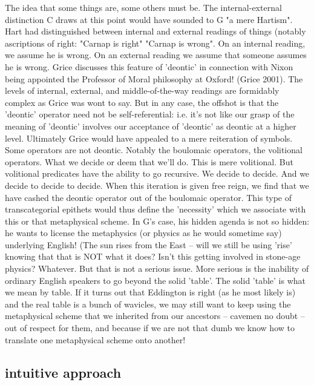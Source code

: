 \documentclass[10pt,titlepage]{book}
\begin{document}
The idea that some things are, some others must be. The  internal-external 
distinction C draws at this point would have sounded to G "a  mere 
Hartism". Hart had distinguished between internal and external readings of  things 
(notably ascriptions of right: "Carnap is right" "Carnap is wrong". On an  
internal reading, we assume he is wrong. On an external reading we assume 
that  someone assumes he is wrong. Grice discusses this feature of 'deontic' 
in  connection with Nixon being appointed the Professor of Moral philosophy 
at  Oxford! (Grice 2001). The levels of internal, external, and 
middle-of-the-way  readings are formidably complex as Grice was wont to say. But in any 
case, the  offshot is that the 'deontic' operator need not be 
self-referential: i.e. it's  not like our grasp of the meaning of 'deontic' involves our 
acceptance of  'deontic' as deontic at a higher level. Ultimately Grice would 
have appealed to  a mere reiteration of symbols. Some operators are not 
deontic. Notably the  boulomaic operators, the volitional operators. What we 
decide or deem that  we'll do. This is mere volitional. But volitional 
predicates have the ability to  go recursive. We decide to decide. And we decide 
to decide to decide. When this  iteration is given free reign, we find that 
we have cashed the deontic operator  out of the boulomaic operator. This type 
of transcategorial epithets would  thus define the 'necessity' which we 
associate with this or that metaphysical  scheme. In G's case, his hidden 
agenda is not so hidden: he wants to license the  metaphysics (or physics as he 
would sometime say) underlying English! (The sun  rises from the East -- will 
we still be using 'rise' knowing that that is NOT  what it does? Isn't this 
getting involved in stone-age physics? Whatever. But  that is not a serious 
issue. More serious is the inability of ordinary English  speakers to go 
beyond the solid 'table'. The solid 'table' is what we mean by  table. If it 
turns out that Eddington is right (as he most likely is) and the  real table 
is a bunch of wavicles, we may still want to keep using the  metaphysical 
scheme that we inherited from our ancestors -- cavemen no doubt --  out of 
respect for them, and because if we are not that dumb we know how to  
translate one metaphysical scheme onto another!
 
\subsection{intuitive approach}
\end{document}
